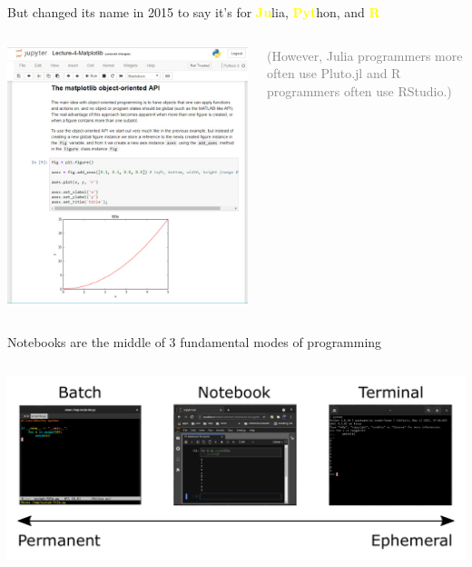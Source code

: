 \documentclass[aspectratio=169]{beamer}
\begin{document}
\begin{frame}{But changed its name in 2015 to say it's for \textcolor{yellow}{\bf Ju}lia, \textcolor{yellow}{\bf Pyt}hon, and \textcolor{yellow}{\bf R}}
\vspace{0.2 cm}
\begin{columns}
\includegraphics[width=\linewidth]{../img/screenshot-2015-jupyter-notebook.png}

\Large
\textcolor{gray}{(However, Julia programmers more often use Pluto.jl and R programmers often use RStudio.)}
\end{columns}
\end{frame}

\begin{frame}{Notebooks are the middle of 3 fundamental modes of programming}
\vspace{0.2 cm}
\begin{columns}
\column{\linewidth}
\includegraphics[width=\linewidth]{../img/fundamental-3-modes-of-programming.pdf}
\end{columns}
\end{frame}
\end{document}
